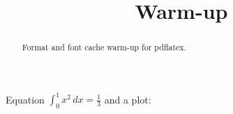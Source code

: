 \documentclass[conference]{IEEEtran}
\begin{document}
\title{Warm-up}\author{}\maketitle
\begin{abstract}Format and font cache warm-up for pdflatex.\end{abstract}
Equation $\int_0^1 x^2\,dx = \frac{1}{3}$ and a plot:
\end{document}
